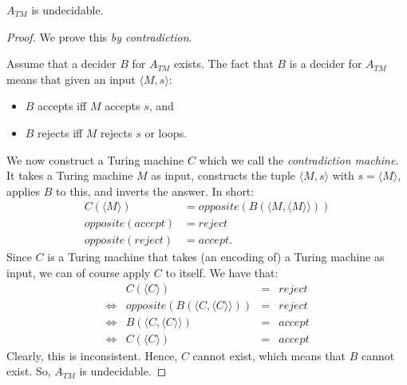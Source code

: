 \begin{theorem}
$A_{TM}$ is undecidable.
\end{theorem}
\vspace{-0.75em}
\begin{proof}
We prove this {\em by contradiction}.

Assume that a decider $B$ for $A_{TM}$ exists. The fact that $B$ is a decider for $A_{TM}$ means that given
an input $\langle M, s \rangle$: 
\begin{itemize}
\item $B$ accepts iff $M$ accepts $s$, and
\item $B$ rejects iff $M$ rejects $s$ or loops.
\end{itemize}

We now construct a Turing machine $C$ which we call the \emph{contradiction machine}. It takes a Turing machine $M$ as input, constructs the tuple $\langle M,s\rangle$ with $s = \langle M\rangle$, applies $B$ to this, and inverts the answer. In short:
\begin{align*}
	C(\langle M \rangle) &= \mathit{opposite}(B(\langle M, \langle M \rangle\rangle)) \\
	\mathit{opposite}(\mathit{accept}) & = \mathit{reject} \\
	\mathit{opposite}(\mathit{reject}) & =  \mathit{accept}.
\end{align*}
Since $C$ is a Turing machine that takes (an encoding of) a Turing machine as input, we
can of course apply $C$ to itself.
We have that:
\begin{equation*}
\begin{array}{crcl}
                 & C(\langle C \rangle) & = & \mathit{reject} \\
\Leftrightarrow  & \mathit{opposite}(B(\langle C, \langle C \rangle\rangle)) & = & \mathit{reject} \\
\Leftrightarrow  & B(\langle C, \langle C \rangle\rangle) & = & \mathit{accept} \\
\Leftrightarrow  &  C(\langle C \rangle)& = & \mathit{accept}
\end{array}
\end{equation*}
Clearly, this is inconsistent. Hence, $C$ cannot exist, which means that $B$ cannot exist.
So, $A_{TM}$ is undecidable.
\end{proof}

